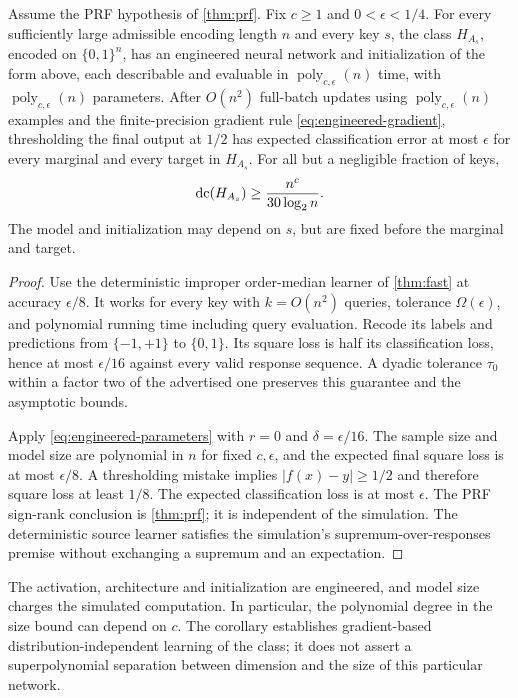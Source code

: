 \begin{corollary}\label{cor:engineered}
Assume the PRF hypothesis of \cref{thm:prf}. Fix $c\ge1$ and $0<\epsilon<1/4$. For every sufficiently large admissible encoding length $n$ and every key $s$, the class $H_{A_s}$, encoded on $\{0,1\}^n$, has an engineered neural network and initialization of the form above, each describable and evaluable in $\operatorname{poly}_{c,\epsilon}(n)$ time, with $\operatorname{poly}_{c,\epsilon}(n)$ parameters. After $O(n^2)$ full-batch updates using $\operatorname{poly}_{c,\epsilon}(n)$ examples and the finite-precision gradient rule \eqref{eq:engineered-gradient}, thresholding the final output at $1/2$ has expected classification error at most $\epsilon$ for every marginal and every target in $H_{A_s}$. For all but a negligible fraction of keys,
\[
 \operatorname{dc}(H_{A_s})\ge\frac{n^c}{30\log_2 n}.
\]
The model and initialization may depend on $s$, but are fixed before the marginal and target.
\end{corollary}
\begin{proof}
Use the deterministic improper order-median learner of \cref{thm:fast} at accuracy $\epsilon/8$. It works for every key with $k=O(n^2)$ queries, tolerance $\Omega(\epsilon)$, and polynomial running time including query evaluation. Recode its labels and predictions from $\{-1,+1\}$ to $\{0,1\}$. Its square loss is half its classification loss, hence at most $\epsilon/16$ against every valid response sequence. A dyadic tolerance $\tau_0$ within a factor two of the advertised one preserves this guarantee and the asymptotic bounds.

Apply \eqref{eq:engineered-parameters} with $r=0$ and $\delta=\epsilon/16$. The sample size and model size are polynomial in $n$ for fixed $c,\epsilon$, and the expected final square loss is at most $\epsilon/8$. A thresholding mistake implies $|f(x)-y|\ge1/2$ and therefore square loss at least $1/8$. The expected classification loss is at most $\epsilon$. The PRF sign-rank conclusion is \cref{thm:prf}; it is independent of the simulation. The deterministic source learner satisfies the simulation's supremum-over-responses premise without exchanging a supremum and an expectation.
\end{proof}

The activation, architecture and initialization are engineered, and model size charges the simulated computation. In particular, the polynomial degree in the size bound can depend on $c$. The corollary establishes gradient-based distribution-independent learning of the class; it does not assert a superpolynomial separation between dimension and the size of this particular network.

